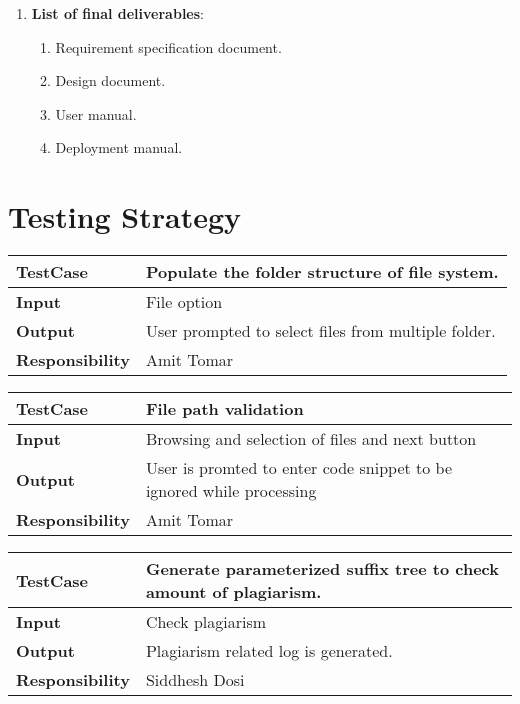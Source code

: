 \documentclass[11pt]{article}
\begin{document}
\begin{enumerate}
\begin{enumerate}
  \end{enumerate}
  \item \textbf{List of final deliverables}:
    \begin{enumerate}
  \item Requirement specification document.
  \item Design document.
  \item User manual.
  \item Deployment manual.
    \end{enumerate}

\end{enumerate}

\section{ Testing Strategy}

  \begin{center}
    \begin{tabular}{ | l | p{10cm} |}
    \hline
    
    \textbf{TestCase} & Populate the folder structure of file system. \\ \hline
    \textbf{Input}      & File option \\ \hline
    \textbf{Output}     & User prompted to select files from multiple folder. \\ \hline
        \textbf{Responsibility}     & Amit Tomar  \\ \hline
    
    \end{tabular}
\end{center}

  \begin{center}
    \begin{tabular}{ | l | p{10cm} |}
    \hline
     \textbf{TestCase} & File path validation \\ \hline
    \textbf{Input}      & Browsing and selection of files and next button \\ \hline
    \textbf{Output}     & User is promted to enter code snippet to be ignored while processing \\ \hline
    \textbf{Responsibility}     & Amit Tomar  \\ \hline
   
    \end{tabular}
\end{center}

  \begin{center}
    \begin{tabular}{ | l | p{10cm} |}
    \hline
     \textbf{TestCase} & Generate parameterized suffix tree to check amount of plagiarism. \\ \hline
    \textbf{Input}      & Check plagiarism \\ \hline
    \textbf{Output}     & Plagiarism related log is generated.  \\ \hline
        \textbf{Responsibility}     & Siddhesh Dosi  \\ \hline
   
    \end{tabular}
\end{center}
\end{document}
